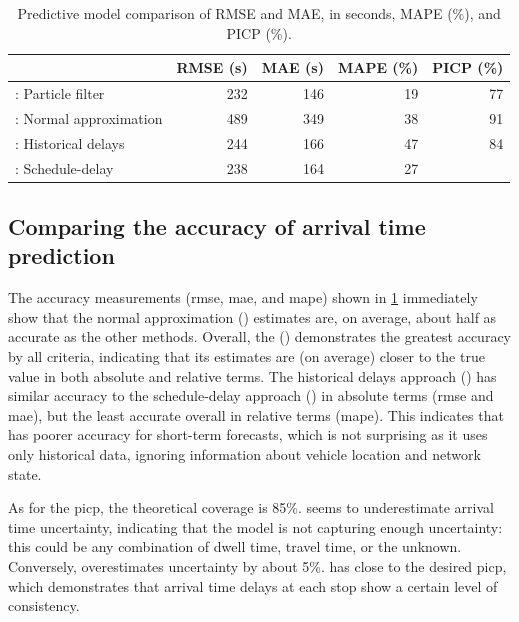 \begin{knitrout}\small
{}\color{fgcolor}\begin{table}

\caption{\label{tab:model_results_rmse}Predictive model comparison of RMSE and MAE, in seconds, MAPE (\%), and PICP (\%).}
\centering
\fontsize{8}{10}\selectfont
\begin{tabular}[t]{lrrrr}
\toprule
  & RMSE (s) & MAE (s) & MAPE (\%) & PICP (\%)\\
\midrule
\Fpf{}: Particle filter & 232 & 146 & 19 & 77\\
\Fnorm{}: Normal approximation & 489 & 349 & 38 & 91\\
\Fhist{}: Historical delays & 244 & 166 & 47 & 84\\
\Fsched{}: Schedule-delay & 238 & 164 & 27 & \\
\bottomrule
\end{tabular}
\end{table}


\end{knitrout}




\subsection{Comparing the accuracy of arrival time prediction}
\label{sec:prediction_model_comp_stats}
The accuracy measurements (\gls{rmse}, \gls{mae}, and \gls{mape}) shown in \cref{tab:model_results_rmse} immediately show that the normal approximation (\Fnorm{}) estimates are, on average, about half as accurate as the other methods. Overall, the \pf{} (\Fpf{}) demonstrates the greatest accuracy by all criteria, indicating that its estimates are (on average) closer to the true value in both absolute and relative terms. The historical delays approach (\Fhist{}) has similar accuracy to the schedule-delay approach (\Fsched{}) in absolute terms (\gls{rmse} and \gls{mae}), but the least accurate overall in relative terms (\gls{mape}). This indicates that \Fhist{} has poorer accuracy for short-term forecasts, which is not surprising as it uses only historical data, ignoring \rt{} information about vehicle location and network state.


As for the \gls{picp}, the theoretical coverage is 85\%. \Fpf{} seems to underestimate arrival time uncertainty, indicating that the model is not capturing enough uncertainty: this could be any combination of dwell time, travel time, or the unknown. Conversely, \Fnorm{} overestimates uncertainty by about 5\%. \Fhist{} has close to the desired \gls{picp}, which demonstrates that arrival time delays at each stop show a certain level of consistency.


